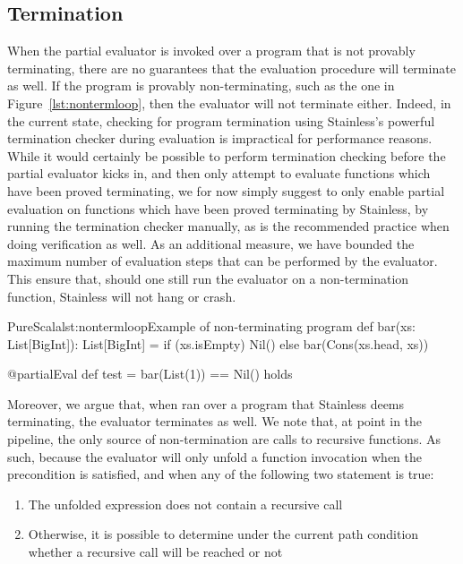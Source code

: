 \documentclass[a4paper,twoside]{article}
\newcommand{\RefFig}[1]{Figure~\ref{#1}}
\begin{document}
\subsection{Termination}
\label{term}

When the partial evaluator is invoked over a program that is not provably terminating, there are no guarantees that the evaluation procedure will terminate as well. If the program is provably non-terminating, such as the one in \RefFig{lst:nontermloop}, then the evaluator will not terminate either. Indeed, in the current state, checking for program termination using Stainless's powerful termination checker during evaluation is impractical for performance reasons. While it would certainly be possible to perform termination checking before the partial evaluator kicks in, and then only attempt to evaluate functions which have been proved terminating, we for now simply suggest to only enable partial evaluation on functions which have been proved terminating by Stainless, by running the termination checker manually, as is the recommended practice when doing verification as well. As an additional measure, we have bounded the maximum number of evaluation steps that can be performed by the evaluator. This ensure that, should one still run the evaluator on a non-termination function, Stainless will not hang or crash.\\

\begin{Code}{PureScala}{lst:nontermloop}{Example of non-terminating program}
def bar(xs: List[BigInt]): List[BigInt] = {
  if (xs.isEmpty) Nil() else bar(Cons(xs.head, xs))
}

@partialEval
def test = {
  bar(List(1)) == Nil()
} holds
\end{Code}

Moreover, we argue that, when ran over a program that Stainless deems terminating, the  evaluator terminates as well. We note that, at point in the pipeline, the only source of non-termination are calls to recursive functions. As such, because the evaluator will only unfold a function invocation when the precondition is satisfied, and when any of the following two statement is true:

\begin{enumerate}[label=(\alph*)]
\item The unfolded expression does not contain a recursive call
\item Otherwise, it is possible to determine under the current path condition whether a recursive call will be reached or not
\end{enumerate}
\end{document}
